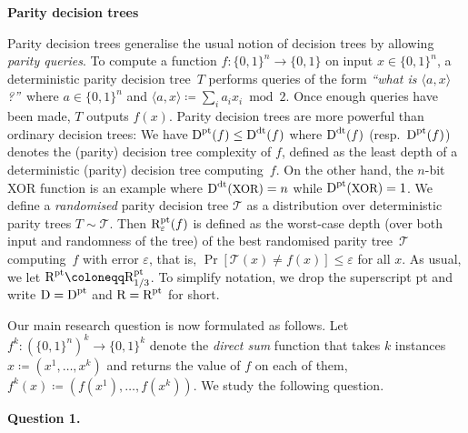 \documentclass[10pt,a4paper]{article}
\begin{document}
\par\medskip\noindent\textbf{Parity decision trees}\par




Parity decision trees generalise the usual notion of decision trees by allowing \emph{parity queries}. To compute a function $f\colon\{0,1\}^{n}\to\{0,1\}$ on input $x\in\{0,1\}^{n}$, a deterministic parity decision tree $T$ performs queries of the form \emph{“what is $\langle a,x\rangle$?”} where $a\in\{0,1\}^{n}$ and $\langle a,x\rangle\coloneqq{\sum_{i}a_{i}x_{i}\bmod 2}$. Once enough queries have been made, $T$ outputs $f(x)$. Parity decision trees are more powerful than ordinary decision trees: We have ${\textup{D}}^{\textup{pt}}(f)\leq{\textup{D}}^{\textup{dt}}(f)$ where ${\textup{D}}^{\textup{dt}}(f)$ (resp. ${\textup{D}}^{\textup{pt}}(f)$) denotes the (parity) decision tree complexity of $f$, defined as the least depth of a deterministic (parity) decision tree computing $f$. On the other hand, the $n$-bit XOR function is an example where ${\textup{D}}^{\textup{dt}}({\textrm{\small{XOR}}})=n$ while ${\textup{D}}^{\textup{pt}}({\textrm{\small{XOR}}})=1$. We define a \emph{randomised} parity decision tree $\mathcal{T}$ as a distribution over deterministic parity trees $T\sim\mathcal{T}$. Then ${\textup{R}}^{\textup{pt}}_{\varepsilon}(f)$ is defined as the worst-case depth (over both input and randomness of the tree) of the best randomised parity tree $\mathcal{T}$ computing $f$ with error $\varepsilon$, that is, $\Pr[\mathcal{T}(x)\neq f(x)]\leq\varepsilon$ for all $x$. As usual, we let ${\textup{R}}^{\textup{pt}}\coloneqq\smash{{\textup{R}}^{\textup{pt}}_{1/3}}$. To simplify notation, we drop the superscript pt and write ${\textup{D}}={\textup{D}}^{\textup{pt}}$ and ${\textup{R}}={\textup{R}}^{\textup{pt}}$ for short.\par




Our main research question is now formulated as follows. Let $f^{k}\colon(\{0,1\}^{n})^{k}\to\{0,1\}^{k}$ denote the \emph{direct sum} function that takes $k$ instances $x\coloneqq(x^{1},\dots,x^{k})$ and returns the value of $f$ on each of them, $f^{k}(x)\coloneqq(f(x^{1}),\dots,f(x^{k}))$. We study the following question.\par





\par\medskip\noindent\textbf{
\textbf{Question 1}\textbf{.}
}\par
\end{document}
